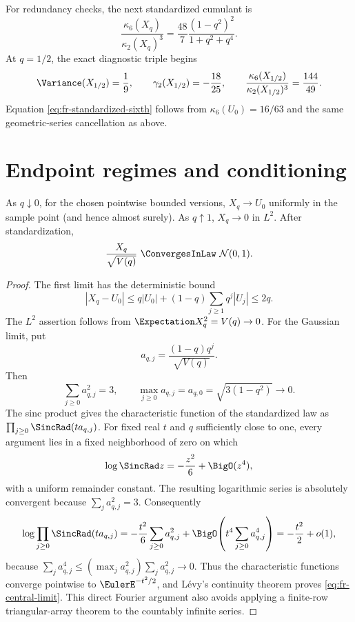 For redundancy checks, the next standardized cumulant is
\begin{equation}
 \frac{\kappa_6(X_q)}{\kappa_2(X_q)^3}
 =\frac{48}{7}\frac{(1-q^2)^2}{1+q^2+q^4}.
 \label{eq:fr-standardized-sixth}
\end{equation}
At \(q=1/2\), the exact diagnostic triple begins
\[
 \Variance(X_{1/2})=\frac19,
 \qquad\gamma_2(X_{1/2})=-\frac{18}{25},
 \qquad\frac{\kappa_6(X_{1/2})}{\kappa_2(X_{1/2})^3}=\frac{144}{49}.
\]
Equation \cref{eq:fr-standardized-sixth} follows from
\(\kappa_6(U_0)=16/63\) and the same geometric-series cancellation as above.

\section{Endpoint regimes and conditioning}
\label{sec:fr-endpoints}

\begin{proposition}
\label{prop:fr-endpoint-laws}
As \(q\downarrow0\), for the chosen pointwise bounded versions,
\(X_q\to U_0\) uniformly in the sample point (and hence almost surely).  As
\(q\uparrow1\), \(X_q\to0\) in \(L^2\).  After standardization,
\begin{equation}
 \frac{X_q}{\sqrt{V(q)}}\ \ConvergesInLaw\ \mathcal N(0,1).
 \label{eq:fr-central-limit}
\end{equation}
\end{proposition}

\begin{proof}
The first limit has the deterministic bound
\[
 |X_q-U_0|
 \le q|U_0|+(1-q)\sum_{j\ge1}q^j|U_j|\le2q.
\]
The \(L^2\) assertion follows from
\(\Expectation X_q^2=V(q)\to0\).  For the Gaussian limit, put
\[
 a_{q,j}=\frac{(1-q)q^j}{\sqrt{V(q)}}.
\]
Then
\[
 \sum_{j\ge0}a_{q,j}^2=3,
 \qquad \max_{j\ge0}a_{q,j}=a_{q,0}
 =\sqrt{3(1-q^2)}\longrightarrow0.
\]
The sinc product gives the characteristic function of the standardized law as
\(\prod_{j\ge0}\SincRad(t a_{q,j})\).  For fixed real \(t\) and \(q\) sufficiently
close to one, every argument lies in a fixed neighborhood of zero on which
\[
 \log\SincRad z=-\frac{z^2}{6}+\BigO(z^4),
\]
with a uniform remainder constant.  The resulting logarithmic series is
absolutely convergent because \(\sum_j a_{q,j}^2=3\).  Consequently
\[
 \log\prod_{j\ge0}\SincRad(t a_{q,j})
 =-\frac{t^2}{6}\sum_{j\ge0}a_{q,j}^2
  +\BigO\!\left(t^4\sum_{j\ge0}a_{q,j}^4\right)
 =-\frac{t^2}{2}+o(1),
\]
because
\(\sum_j a_{q,j}^4\le(\max_j a_{q,j}^2)\sum_j a_{q,j}^2\to0\).
Thus the characteristic functions converge pointwise to \(\EulerE^{-t^2/2}\),
and L\'evy's continuity theorem proves \cref{eq:fr-central-limit}.  This direct
Fourier argument also avoids applying a finite-row triangular-array theorem to
the countably infinite series.
\end{proof}

